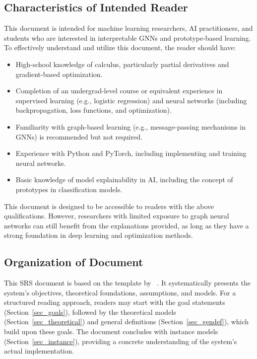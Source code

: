 \documentclass[12pt]{article}
\begin{document}
\subsection{Characteristics of Intended Reader} \label{sec_IntendedReader}

This document is intended for machine learning researchers, AI practitioners, and students who are interested in interpretable GNNs and prototype-based learning. To effectively understand and utilize this document, the reader should have:
\begin{itemize}
    \item High-school knowledge of calculus, particularly partial derivatives and gradient-based optimization.
    \item Completion of an undergrad-level course or equivalent experience in
supervised learning (e.g., logistic regression) and
neural networks (including backpropagation, loss functions, and optimization).
    \item Familiarity with graph-based learning (e.g., message-passing mechanisms in GNNs) is recommended but not required.
    \item Experience with Python and PyTorch, including implementing and training neural networks.
    \item Basic knowledge of model explainability in AI, including the concept of prototypes in classification models.
\end{itemize}

This document is designed to be accessible to readers with the above qualifications. However, researchers with limited exposure to graph neural networks can still benefit from the explanations provided, as long as they have a strong foundation in deep learning and optimization methods.

\subsection{Organization of Document}

This SRS document is based on the template by ~\citep{SmithAndLai2005, SmithEtAl2007}. It systematically presents the system's objectives, theoretical foundations, assumptions, and models. For a structured reading approach, readers may start with the goal statements (Section~\ref{sec_goals}), followed by the theoretical models (Section~\ref{sec_theoretical}) and general definitions (Section~\ref{sec_gendef}), which build upon these goals. The document concludes with instance models (Section~\ref{sec_instance}), providing a concrete understanding of the system’s actual implementation.
\end{document}
